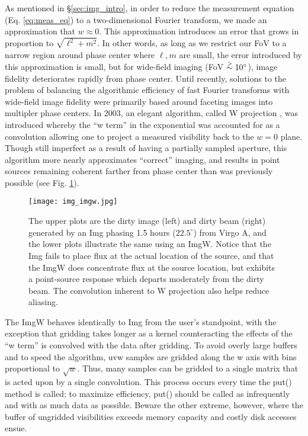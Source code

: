 As mentioned in \S\ref{sec:img_intro}, in order to reduce the measurement
equation (Eq. \ref{eq:meas_eq}) to a two-dimensional Fourier transform, we
made an approximation that $w\approx0$.  This approximation introduces an
error that grows in proportion to $\sqrt{\ell^2+m^2}$.  In other words, as
long as we restrict our FoV to a narrow region around phase center where
$\ell,m$ are small, the error introduced by this approximation is small, but
for wide-field imaging (FoV $\buildrel>\over\sim 10^\circ$), image fidelity
deteriorates rapidly from phase center.  Until recently, solutions to the
problem of balancing the algorithmic efficiency of fast Fourier transforms
with wide-field image fidelity were primarily based around faceting images
into multipler phase centers.  In 2003, an elegant algorithm, called W
projection \cite{cornwell_et_al_2003, cornwell_et-al_2005_347}, was introduced
whereby the ``w term'' in the exponential was accounted for as a convolution
allowing one to project a measured visibility back to the $w=0$ plane.  Though
still imperfect as a result of having a partially sampled aperture, this
algorithm more nearly approximates ``correct'' imaging, and results in
point sources remaining coherent farther from phase center than was previously
possible (see Fig. \ref{fig:img_imgw}).

\begin{figure}
\begin{center}
\texttt{[image: img\_imgw.jpg]}
\caption{The upper plots are the dirty image (left) and dirty beam (right)
generated by an Img phasing 1.5 hours ($22.5^\circ$) from Virgo A, and the 
lower plots illustrate the same using an ImgW.  Notice that the Img fails
to place flux at the actual location of the source, and that the ImgW does
concentrate flux at the source location, but exhibits a point-source response
which departs moderately from the dirty beam.  The convolution inherent to
W projection also helps reduce aliasing.  }
\label{fig:img_imgw}
\end{center}
\end{figure}

The ImgW behaves identically to Img from the user's standpoint, with the
exception that gridding takes longer as a kernel counteracting the effects
of the ``w term'' is convolved with the data after gridding.  To avoid
overly large buffers and to speed the algorithm, uvw samples are gridded
along the w axis with bins proportional to $\sqrt{w}$.  Thus, many samples
can be gridded to a single matrix that is acted upon by a single convolution.
This process occurs every time the put() method is called; to maximize
efficiency, put() should be called as infrequently and with as much data as 
possible.  Beware the other extreme, however, where the buffer of ungridded
visibilities exceeds memory capacity and costly disk accesses ensue.

